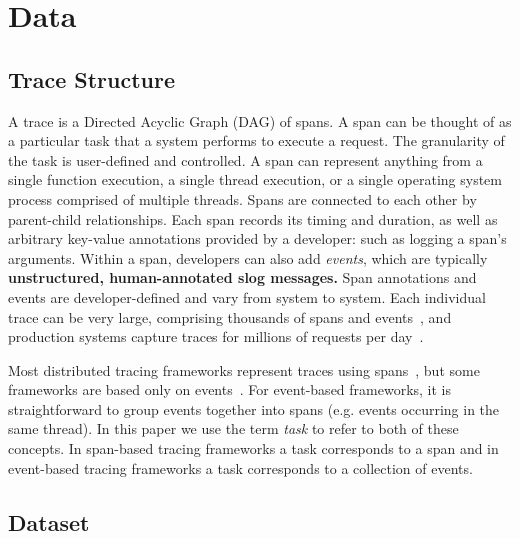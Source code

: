\section{Data}
\label{sec:data}

\subsection{Trace Structure}

A trace is a Directed Acyclic Graph (DAG) of spans. A span can be thought
of as a particular task that a system performs to execute a request. The granularity of the task
is user-defined and controlled. A span can represent anything from a single function execution, 
a single thread execution, or a single operating system process comprised of multiple threads.
Spans are connected to each other by parent-child relationships. 
Each span records its timing and duration, as well as arbitrary key-value annotations provided by a developer: such as logging a span's arguments.
Within a span, developers can also add \emph{events}, which are typically \textbf{unstructured, human-annotated slog messages.}
Span annotations and events are developer-defined and vary from system to system.
Each individual trace can be very large, comprising thousands of spans and events~\cite{kaldor2017canopy, las2019sifter, shkurographdiffviz}, and production systems capture traces for millions of requests per day~\cite{kaldor2017canopy}.

Most distributed tracing frameworks represent traces using spans~\cite{jaeger,opentelemetry,sigelman2010dapper}, but some frameworks are based only on events~\cite{fonseca2007xtrace}.  
For event-based frameworks, it is straightforward to group events together into spans (e.g. events occurring in the same thread). 
In this paper we use the term \emph{task} to refer to both of these concepts. In span-based tracing frameworks a task corresponds to a span and in event-based tracing
frameworks a task corresponds to a collection of events.

\subsection{Dataset}

